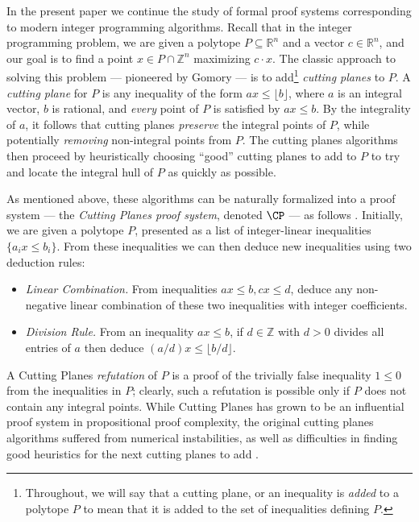 \documentclass[11pt]{article}
\numberwithin{equation}{section}
\theoremstyle{definition}
\theoremstyle{plain}
\newcounter{cor}\renewcommand{\thecor}{1.1.\arabic{cor}}\newenvironment{cor}{\ifnum\value{cor}=0\refstepcounter{cor}\else\PackageError{toc-native-compat}{Unsupported additional cor envelope}{Only the one exact source-observed cor paragraph is allowed.}\fi}{}\providecommand{\corautorefname}{Theorem}
\newcommand{\reals}{\ensuremath{\mathbb{R}}}
\newcommand{\integers}{\ensuremath{\mathbb{Z}}}
\newcommand{\set}[1]{\{ #1 \}}
\begin{document}
In the present %
paper   %
we continue the study of formal proof systems corresponding to modern integer programming algorithms.
Recall that in the integer programming problem, we are given a polytope $P \subseteq \reals^n$ and a vector $c \in \reals^n$, and our goal is to find a point $x \in P \cap \integers^n$ maximizing $c \cdot x$.
The classic approach to solving this problem --- pioneered by Gomory \cite{gomory1963algorithm} --- is to add\footnote{Throughout, we will say that a cutting plane, or an inequality is \emph{added} to a polytope $P$ to mean that it is added to the set of inequalities defining $P$.} \emph{cutting planes} to  $P$.
A \emph{cutting plane} for $P$ is any inequality of the form $ax \leq \lfloor b \rfloor$, where $a$ is an integral vector, $b$ is rational, and \emph{every} point of $P$ is satisfied by $ax \leq b$.
By the integrality of $a$, it follows that cutting planes \emph{preserve} the integral points of $P$, while potentially \emph{removing} non-integral points from $P$.
The cutting planes algorithms then proceed by heuristically choosing ``good'' cutting planes to add to $P$ to try and locate the integral hull of $P$ as quickly as possible.

As mentioned above, these algorithms can be naturally formalized into a proof system --- the \emph{Cutting Planes proof system}, denoted $\CP$ --- as follows \cite{Chvatal73a}.
Initially, we are given a polytope $P$, presented as a list of integer-linear inequalities $\set{a_i x \leq b_i}$.
From these inequalities we can then deduce new inequalities using two deduction rules:
\begin{itemize}
	\item \emph{Linear Combination.} From inequalities $ax \leq b, cx \leq d$, deduce any non-negative linear combination of these two inequalities with integer coefficients.
	\item \emph{Division Rule.} From an inequality $ax \leq b$, if $d \in \integers$ with $d > 0$ divides all entries of $a$ then deduce $(a/d)x \leq \lfloor b/d \rfloor$.
\end{itemize}
A Cutting Planes \emph{refutation} of $P$ is a proof of the trivially false inequality $1 \leq 0$ from the inequalities in $P$; clearly, such a refutation is possible only if $P$ does not contain any integral points.
While Cutting Planes has grown to be an influential proof system in propositional proof complexity, the original cutting planes algorithms suffered from numerical instabilities, as well as difficulties in finding good heuristics for the next cutting planes to add \cite{gomory1963algorithm}.
\end{document}
